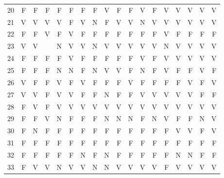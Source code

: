 \begin{apendicesenv}
\begin{center}
\begin{tabular}{ l r r r r r r r r r r r r r r r r r}
	20	&	F	&	F	&	F	&	F	&	F	&	F	&	F	&	V	&	F	&	F	&	V	&	F	&	V	&	V	&	V	&	V	&	V	\\
	21	&	V	&	V	&	V	&	V	&	F	&	V	&	N	&	F	&	V	&	V	&	N	&	V	&	V	&	V	&	V	&	V	&	V	\\
	22	&	F	&	F	&	V	&	F	&	V	&	F	&	F	&	F	&	F	&	F	&	F	&	F	&	V	&	F	&	F	&	F	&	F	\\
	23	&	V	&	V	&		&	N	&	V	&	V	&	N	&	V	&	V	&	V	&	V	&	V	&	N	&	V	&	V	&	V	&	V	\\
	24	&	F	&	F	&	F	&	F	&	V	&	F	&	F	&	F	&	F	&	F	&	V	&	F	&	V	&	V	&	V	&	V	&	V	\\
	25	&	F	&	F	&	F	&	N	&	N	&	F	&	N	&	V	&	V	&	F	&	N	&	F	&	V	&	F	&	F	&	V	&	F	\\
	26	&	V	&	F	&	F	&	V	&	F	&	V	&	F	&	F	&	F	&	V	&	F	&	F	&	F	&	F	&	V	&	F	&	V	\\
	27	&	V	&	V	&	F	&	V	&	V	&	F	&	F	&	N	&	F	&	F	&	V	&	V	&	V	&	V	&	V	&	F	&	F	\\
	28	&	F	&	V	&	F	&	V	&	V	&	V	&	V	&	V	&	V	&	V	&	V	&	V	&	V	&	V	&	V	&	V	&	V	\\
	29	&	F	&	F	&	V	&	N	&	F	&	F	&	F	&	N	&	N	&	N	&	F	&	N	&	V	&	F	&	F	&	N	&	V	\\
	30	&	F	&	N	&	F	&	F	&	F	&	F	&	F	&	F	&	F	&	F	&	F	&	F	&	F	&	V	&	V	&	F	&	V	\\
	31	&	F	&	F	&	F	&	F	&	F	&	F	&	F	&	F	&	F	&	F	&	F	&	F	&	F	&	F	&	F	&	F	&	F	\\
	32	&	F	&	F	&	F	&	F	&	F	&	N	&	F	&	N	&	F	&	F	&	F	&	F	&	F	&	N	&	N	&	F	&	F	\\
	33	&	F	&	V	&	V	&	N	&	V	&	V	&	N	&	N	&	V	&	V	&	V	&	V	&	F	&	V	&	V	&	V	&	V	\\
	
	\hline
	\bottomrule
	\end{tabular}
\end{center}


\end{apendicesenv}
